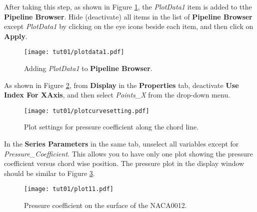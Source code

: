 After taking this step, as shown in Figure \ref{fig1:plotdata-list}, the \textit{PlotData1} item is added to tthe \textbf{Pipeline Browser}. Hide (deactivate) all items in the list of \textbf{Pipeline Browser} except \textit{PlotData1} by clicking on the eye icons beside each item, and then click on \textbf{Apply}.
\begin{figure}[htbp]
    \centering
    \texttt{[image: tut01/plotdata1.pdf]}
    \caption{Adding \textit{PlotData1} to \textbf{Pipeline Browser}.}
    \label{fig1:plotdata-list}
\end{figure}
As shown in Figure \ref{fig1:pointsx}, from \textbf{Display} in the \textbf{Properties} tab, deactivate \textbf{Use Index For XAxis}, and then select \textit{Points\_X} from the drop-down menu. 
\begin{figure}[htbp]
    \centering
    \texttt{[image: tut01/plotcurvesetting.pdf]}
    \caption{Plot settings for pressure coefficient along the chord line.}
    \label{fig1:pointsx}
\end{figure}
In the \textbf{Series Parameters} in the same tab, unselect all variables except for \textit{Pressure\_Coefficient}. This allows you to have only one plot showing the pressure coefficient versus chord wise position. The pressure plot in the display window should be similar to Figure \ref{fig1:surface_pressure}.
\begin{figure}[htbp]
    \centering
    \texttt{[image: tut01/plot11.pdf]}
    \caption{Pressure coefficient on the surface of the NACA0012.}
    \label{fig1:surface_pressure}
\end{figure}

